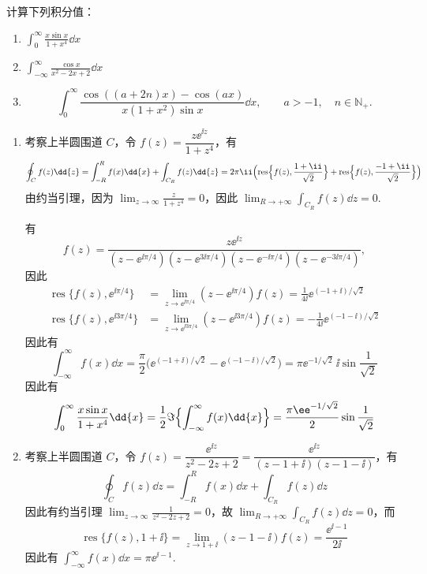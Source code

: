 
\begin{question}
计算下列积分值：
\begin{enumerate}
  \item \(\displaystyle\int_0^\infty \frac{x\sin x}{1+x^4}\dd{x}\)

  \item \(\displaystyle\int_{-\infty}^\infty \frac{\cos x}{x^2-2x+2}\dd{x}\)

  \item
  \[
  \int_0^\infty
  \frac{\cos((a+2n)x)-\cos(ax)}{x(1+x^2)\sin x}\dd{x},
  \qquad a>-1,\quad n\in\mathbb{N}_+.
  \]
\end{enumerate}

\begin{solution}
\begin{enumerate}
  \item 考察上半圆围道 \(C\)，令 \(f(z)=\dfrac{z\ee^{\ii z}}{1+z^4}\)，有
\[
\oint_C f(z)\dd{z}=\int_{-R}^{R}f(x)\dd{x}+\int_{C_R}f(z)\dd{z}=2\pi\ii\Bigl(\operatorname{res}\Bigl\{f(z),\frac{1+\ii}{\sqrt2}\Bigr\}+\operatorname{res}\Bigl\{f(z),\frac{-1+\ii}{\sqrt2}\Bigr\}\Bigr)
\]
由约当引理，因为 \(\displaystyle\lim_{z\to\infty}\frac{z}{1+z^4}=0\)，因此 \(\displaystyle\lim_{R\to+\infty}\int_{C_R}f(z)\dd{z}=0\).

有
\[
f(z)=\frac{z\ee^{\ii z}}
{(z-\ee^{\ii\pi/4})(z-\ee^{3\ii\pi/4})
 (z-\ee^{-\ii\pi/4})(z-\ee^{-3\ii\pi/4})},
\]
因此
\[
\begin{aligned}
\operatorname{res}\{f(z),\ee^{\ii\pi/4}\}&=\lim_{z\to\ee^{\ii\pi/4}}(z-\ee^{\ii\pi/4})f(z)=\frac1{4\ii}\ee^{(-1+\ii)/\sqrt2}\\
\operatorname{res}\{f(z),\ee^{\ii3\pi/4}\}&=\lim_{z\to\ee^{\ii3\pi/4}}(z-\ee^{\ii3\pi/4})f(z)=-\frac1{4\ii}\ee^{(-1-\ii)/\sqrt2}
\end{aligned}
\]
因此有
\[
\int_{-\infty}^{\infty}f(x)\dd{x}=\frac{\pi}{2}\bigl(\ee^{(-1+\ii)/\sqrt2}-\ee^{(-1-\ii)/\sqrt2}\bigr)=\pi\ee^{-1/\sqrt2}\,\ii\sin\frac1{\sqrt2}
\]
因此有
\[
\int_0^{\infty}\frac{x\sin x}{1+x^4}\dd{x}=\frac12\Im\Bigl\{\int_{-\infty}^{\infty}f(x)\dd{x}\Bigr\}=\frac{\pi\ee^{-1/\sqrt2}}{2}\sin\frac1{\sqrt2}
\]

  \item 考察上半圆围道 \(C\)，令 \(f(z)=\dfrac{\ee^{\ii z}}{z^2-2z+2}=\dfrac{\ee^{\ii z}}{(z-1+\ii)(z-1-\ii)}\)，有
\[
\oint_C f(z)\dd{z}=\int_{-R}^{R}f(x)\dd{x}+\int_{C_R}f(z)\dd{z}
\]
因此有约当引理 \(\displaystyle\lim_{z\to\infty}\frac1{z^2-2z+2}=0\)，故 \(\displaystyle\lim_{R\to+\infty}\int_{C_R}f(z)\dd{z}=0\)，而
\[
\operatorname{res}\{f(z),1+\ii\}=\lim_{z\to1+\ii}(z-1-\ii)f(z)=\frac{\ee^{\ii-1}}{2\ii}
\]
因此有 \(\displaystyle\int_{-\infty}^{\infty}f(x)\dd{x}=\pi\ee^{\ii-1}\).


\end{enumerate}
\end{solution}
\end{question}
